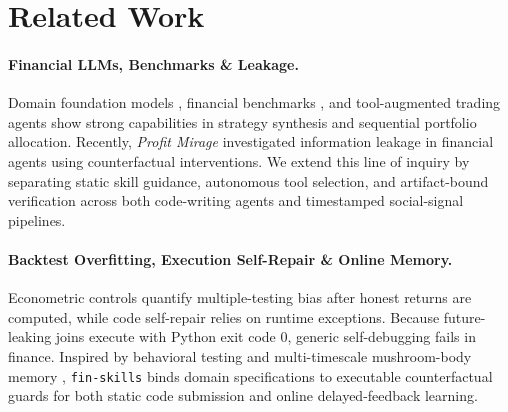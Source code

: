 \section{Related Work}
\label{sec:related}

\paragraph{Financial LLMs, Benchmarks \& Leakage.}
Domain foundation models \citep{wu2023bloomberggpt,yang2023fingpt}, financial benchmarks \citep{xie2024finben,li2024investorbench,bigeard2025finance}, and tool-augmented trading agents \citep{yu2024finmem,zhang2024finagent,chen2025stockbench} show strong capabilities in strategy synthesis and sequential portfolio allocation. Recently, \emph{Profit Mirage} \citep{li2025profit} investigated information leakage in financial agents using counterfactual interventions. We extend this line of inquiry by separating static skill guidance, autonomous tool selection, and artifact-bound verification across both code-writing agents and timestamped social-signal pipelines.

\paragraph{Backtest Overfitting, Execution Self-Repair \& Online Memory.}
Econometric controls \citep{white2000reality,hansen2005spa,bailey2014deflated,bailey2017pbo} quantify multiple-testing bias after honest returns are computed, while code self-repair \citep{shinn2023reflexion,chen2023selfdebug} relies on runtime exceptions. Because future-leaking joins execute with Python exit code $0$, generic self-debugging fails in finance. Inspired by behavioral testing \citep{ribeiro2020checklist} and multi-timescale mushroom-body memory \citep{huang2024memory}, \texttt{fin-skills} binds domain specifications to executable counterfactual guards for both static code submission and online delayed-feedback learning.

